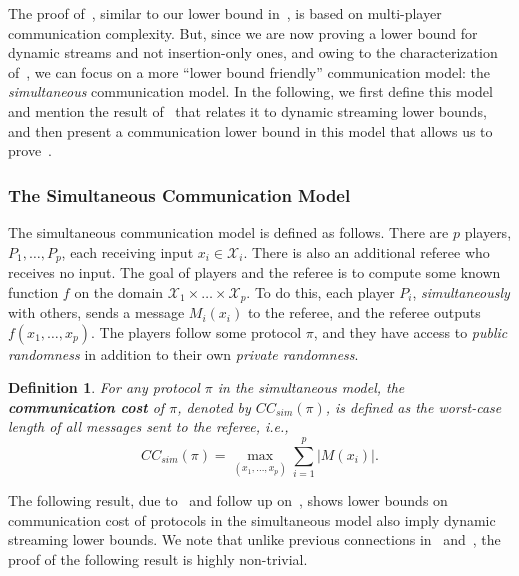 \documentclass[11pt]{article}
\newtheorem{definition}[lemma]{Definition}
\theoremstyle{definition}
\newcommand{\card}[1]{\left\vert{#1}\right\vert}
\begin{document}
The proof of~, similar to our lower bound in~, is based on multi-player communication complexity. But, since we are now proving a 
lower bound for dynamic streams and not insertion-only ones, and owing to the characterization of~\cite{AiHLW16}, we can focus on a more ``lower bound friendly'' communication model: the \emph{simultaneous} communication model. 
In the following, we first define this model and mention the result of~\cite{AiHLW16} that relates it to dynamic streaming lower bounds, and then present a communication lower bound in this model that allows us to prove~. 

\subsubsection{The Simultaneous Communication Model}\label{sec:sim} 

The simultaneous communication model is defined as follows. There are $p$ players, $P_1, \ldots, P_p$, each receiving input $x_i \in \mathcal{X}_i$. There is also an additional referee who receives no input. 
The goal of players and the referee is to compute some known function  $f$ on the domain $ \mathcal{X}_1\times\ldots\times \mathcal{X}_p$. To do this, each player $P_i$, \emph{simultaneously} with others, 
sends a message $M_i(x_i)$ to the referee, and the referee outputs $f(x_1,\ldots,x_p)$. The players follow some protocol $\pi$, and they have access to \textit{public randomness} in addition to their own \textit{private randomness}.


 \begin{definition}
    For any protocol $\pi$ in the simultaneous model, the \textnormal{\textbf{communication cost}} of $\pi$, denoted by $CC_{sim}(\pi)$, is defined as the worst-case length of all messages sent to the referee, i.e., 
    \[
    CC_{sim}(\pi) = \max_{(x_1, \ldots, x_p)} \sum_{i=1}^p \card{M(x_i)}.
    \]
\end{definition}

The following result, due to~\cite{AiHLW16} and follow up on~\cite{LiNW14}, shows lower bounds on communication cost of protocols in the simultaneous model also imply
dynamic streaming lower bounds. We note that unlike previous connections in~ and~, the proof of the following result is highly non-trivial. 
\end{document}
